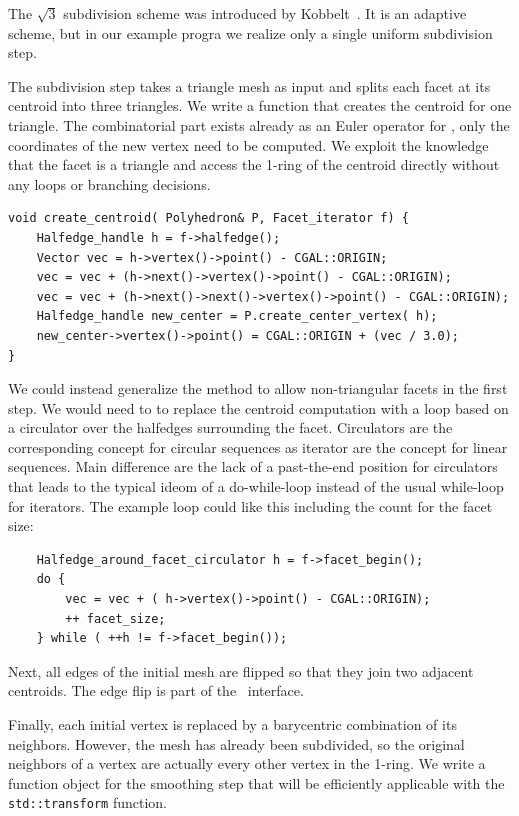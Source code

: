 \label{sec:sqrt3}


The $\sqrt{3}$ subdivision scheme was introduced by
Kobbelt~\cite{sqrt3}. It is an adaptive scheme, but in our example
progra we realize only a single uniform subdivision step.

The subdivision step takes a triangle mesh as input and splits each
facet at its centroid into three triangles.  We write a function that
creates the centroid for one triangle. The combinatorial part exists
already as an Euler operator for \cgalpoly, only the coordinates of
the new vertex need to be computed. We exploit the knowledge that the
facet is a triangle and access the 1-ring of the centroid directly
without any loops or branching decisions.

\begin{lstlisting}
void create_centroid( Polyhedron& P, Facet_iterator f) {
    Halfedge_handle h = f->halfedge();
    Vector vec = h->vertex()->point() - CGAL::ORIGIN;
    vec = vec + (h->next()->vertex()->point() - CGAL::ORIGIN);
    vec = vec + (h->next()->next()->vertex()->point() - CGAL::ORIGIN);
    Halfedge_handle new_center = P.create_center_vertex( h);
    new_center->vertex()->point() = CGAL::ORIGIN + (vec / 3.0);
}
\end{lstlisting}

We could instead generalize the method to allow non-triangular facets
in the first step. We would need to to replace the centroid
computation with a loop based on a circulator over the halfedges
surrounding the facet. Circulators are the corresponding concept for
circular sequences as iterator are the concept for linear sequences.
Main difference are the lack of a past-the-end position for
circulators that leads to the typical ideom of a do-while-loop instead
of the usual while-loop for iterators. The example loop could like this
including the count for the facet size:

\begin{lstlisting}
    Halfedge_around_facet_circulator h = f->facet_begin();
    do {
        vec = vec + ( h->vertex()->point() - CGAL::ORIGIN);
        ++ facet_size;
    } while ( ++h != f->facet_begin());
\end{lstlisting}

Next, all edges of the initial mesh are flipped so that they join two
adjacent centroids. The edge flip is part of the \cgalpoly\ interface.

Finally, each initial vertex is replaced by a barycentric combination
of its neighbors. However, the mesh has already been subdivided, so
the original neighbors of a vertex are actually every other vertex in
the 1-ring. We write a function object for the smoothing step that
will be efficiently applicable with the \lstinline!std::transform!
function.

